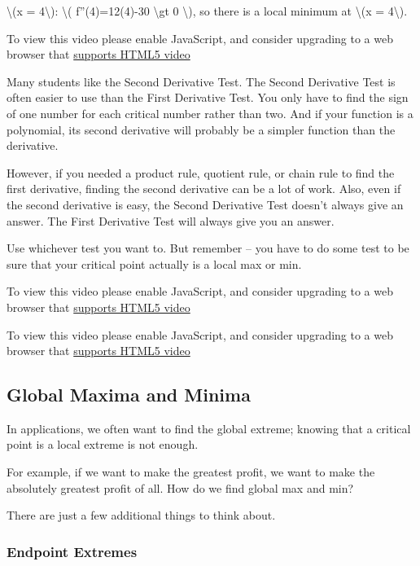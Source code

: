 \textbackslash{}(x = 4\textbackslash{}): \textbackslash{}(
f''(4)=12(4)-30 \textbackslash{}gt 0 \textbackslash{}), so there is a
local minimum at \textbackslash{}(x = 4\textbackslash{}).

To view this video please enable JavaScript, and consider upgrading to a
web browser that \href{http://videojs.com/html5-video-support/}{supports
HTML5 video}

Many students like the Second Derivative Test. The Second Derivative
Test is often easier to use than the First Derivative Test. You only
have to find the sign of one number for each critical number rather than
two. And if your function is a polynomial, its second derivative will
probably be a simpler function than the derivative.

However, if you needed a product rule, quotient rule, or chain rule to
find the first derivative, finding the second derivative can be a lot of
work. Also, even if the second derivative is easy, the Second Derivative
Test doesn't always give an answer. The First Derivative Test will
always give you an answer.

Use whichever test you want to. But remember -- you have to do some test
to be sure that your critical point actually is a local max or min.

To view this video please enable JavaScript, and consider upgrading to a
web browser that \href{http://videojs.com/html5-video-support/}{supports
HTML5 video}

To view this video please enable JavaScript, and consider upgrading to a
web browser that \href{http://videojs.com/html5-video-support/}{supports
HTML5 video}

\hypertarget{global-maxima-and-minima}{%
\subsection{Global Maxima and Minima}\label{global-maxima-and-minima}}

In applications, we often want to find the global extreme; knowing that
a critical point is a local extreme is not enough.

For example, if we want to make the greatest profit, we want to make the
absolutely greatest profit of all. How do we find global max and min?

There are just a few additional things to think about.

\hypertarget{endpoint-extremes}{%
\subsubsection{Endpoint Extremes}\label{endpoint-extremes}}

